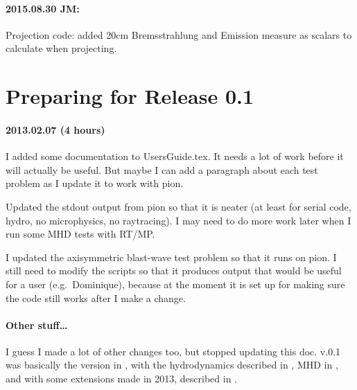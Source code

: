 \documentclass[a4paper,11pt]{article}
\begin{document}
\paragraph{2015.08.30 JM:}
Projection code: added 20cm Bremsstrahlung and Emission measure as scalars to calculate when projecting.


\section{Preparing for Release 0.1}
\paragraph{2013.02.07 (4 hours)}
I added some documentation to UsersGuide.tex.
It needs a lot of work before it will actually be useful.
But maybe I can add a paragraph about each test problem as I update it to work with pion.

Updated the stdout output from pion so that it is neater (at least for serial code, hydro, no microphysics, no raytracing).  I may need to do more work later when I run some MHD tests with RT/MP.

I updated the axisymmetric blast-wave test problem so that it runs on pion.
I still need to modify the scripts so that it produces output that would be useful for a user (e.g.\ Dominique), because at the moment it is set up for making sure the code still works after I make a change.

\paragraph{Other stuff\ldots}
I guess I made a lot of other changes too, but stopped updating this doc.
\pion{} v.0.1 was basically the version in \citet{Mac12}, with the hydrodynamics described in \citet{MacLim10}, MHD in \citet{MacLim11}, and with some extensions made in 2013, described in \citet{MacLanGva13}.





\end{document}
